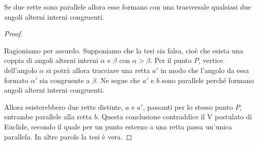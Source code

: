 %     

\begin{teorema}
  Se due rette sono parallele allora esse formano con una trasversale 
  qualsiasi due angoli alterni interni congruenti.
\end{teorema}

\begin{proof}
~

\noindent \begin{minipage}{0.6\textwidth}
    Ragioniamo per assurdo. Supponiamo che la tesi sia falsa, cioè che 
    esista una coppia di angoli alterni interni \(\alpha\) e \(\beta\) con 
    \(\alpha>\beta\). Per il punto \(P\), vertice dell'angolo \(\alpha\) si 
    potrà allora tracciare una retta \(a'\) in modo che l'angolo da essa 
    formato \(\alpha'\) sia congruente a \(\beta\). Ne segue che \(a'\) e \(b\) 
    sono parallele perché formano angoli alterni interni congruenti.
\end{minipage}\hfil
\begin{minipage}{0.4\textwidth}
  \centering
\end{minipage} 
    Allora esisterebbero due rette distinte, \(a\) e \(a'\), passanti per lo 
    stesso punto \(P\), entrambe parallele alla retta \(b\). 
Questa conclusione contraddice il V postulato di Euclide, secondo il quale 
per un punto esterno a una retta passa un'unica parallela. In altre 
parole la tesi è vera.
  \end{proof}

